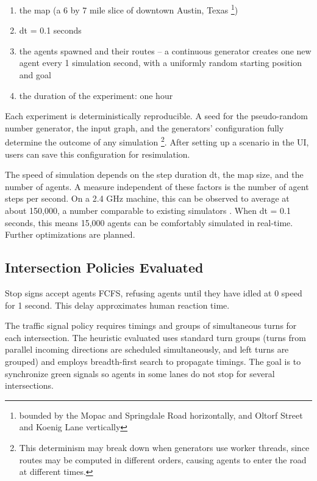 \documentclass[letterpaper, 10 pt, conference]{ieeeconf}  %
\begin{document}
\begin{enumerate}
  \item the map (a 6 by 7 mile slice of downtown Austin, Texas
        \footnote{bounded by the Mopac and Springdale Road horizontally,
        and Oltorf Street and Koenig Lane vertically})
  \item dt = 0.1 seconds
  \item the agents spawned and their routes -- a continuous generator creates
        one new agent every 1 simulation second, with a uniformly random
        starting position and goal
  \item the duration of the experiment: one hour
\end{enumerate}

Each experiment is deterministically reproducible. A seed for the pseudo-random
number generator, the input graph, and the generators' configuration fully
determine the outcome of any simulation \footnote{This determinism may break
  down when generators use worker threads, since routes may be computed in
different orders, causing agents to enter the road at different times.}. After
setting up a scenario in the UI, users can save this configuration for
resimulation.

The speed of simulation depends on the step duration dt, the map size, and the
number of agents. A measure independent of these factors is the number of agent
steps per second. On a 2.4 GHz machine, this can be observed to average at about
150,000, a number comparable to existing simulators \cite{SUMOthesis}. When dt
= 0.1 seconds, this means 15,000 agents can be comfortably simulated in
real-time. Further optimizations are planned.

\subsection{Intersection Policies Evaluated}

Stop signs accept agents FCFS, refusing agents until they have idled at 0 speed
for 1 second. This delay approximates human reaction time.

The traffic signal policy requires timings and groups of simultaneous turns for
each intersection. The heuristic evaluated uses standard turn groups (turns from
parallel incoming directions are scheduled simultaneously, and left turns are
grouped) and employs breadth-first search to propagate timings. The goal is to
synchronize green signals so agents in some lanes do not stop for several
intersections.
\end{document}
